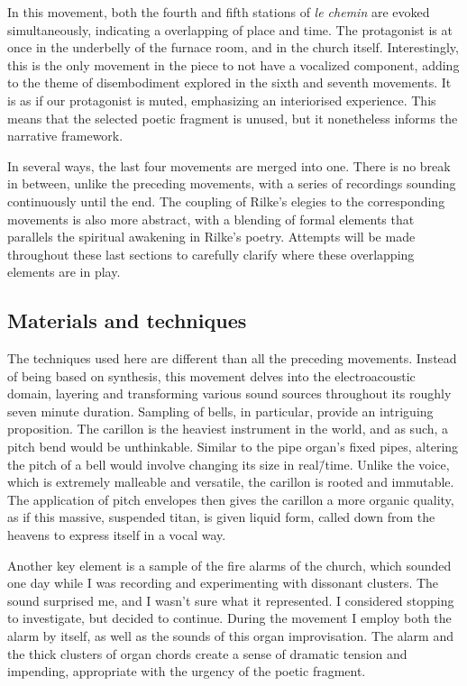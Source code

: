 \documentclass[12pt,twoside,maitrise]{dms_ks}
\theoremstyle{definition}
\begin{document}
{In this movement, both the fourth and fifth stations of \textit{le chemin} are evoked simultaneously, indicating a overlapping of place and time. 
The protagonist is at once in the underbelly of the furnace room, and in the church itself. 
Interestingly, this is the only movement in the piece to not have a vocalized component, adding to the theme of disembodiment explored in the sixth and seventh movements.
It is as if our protagonist is muted, emphasizing an interiorised experience.
This means that the selected poetic fragment is unused, but it nonetheless informs the narrative framework. 

In several ways, the last four movements are merged into one. 
There is no break in between, unlike the preceding movements, with a series of recordings sounding continuously until the end. 
The coupling of Rilke's elegies to the corresponding movements is also more abstract, with a blending of formal elements that parallels the spiritual awakening in Rilke’s poetry. 
Attempts will be made throughout these last sections to carefully clarify where these overlapping elements are in play.

\subsection{Materials and techniques}

The techniques used here are different than all the preceding movements. 
Instead of being based on synthesis, this movement delves into the electroacoustic domain, layering and transforming various sound sources throughout its roughly seven minute duration. 
Sampling of bells, in particular, provide an intriguing proposition. 
The carillon is the heaviest instrument in the world, and as such, a pitch bend would be unthinkable. 
Similar to the pipe organ's fixed pipes, altering the pitch of a bell would involve changing its size in real\=/time. 
Unlike the voice, which is extremely malleable and versatile, the carillon is rooted and immutable. 
The application of pitch envelopes then gives the carillon a more organic quality, as if this massive, suspended titan, is given liquid form, called down from the heavens to express itself in a vocal way.

Another key element is a sample of the fire alarms of the church, which sounded one day while I was recording and experimenting with dissonant clusters. 
The sound surprised me, and I wasn’t sure what it represented. 
I considered stopping to investigate, but decided to continue. 
During the movement I employ both the alarm by itself, as well as the sounds of this organ improvisation.
The alarm and the thick clusters of organ chords create a sense of dramatic tension and impending, appropriate with the urgency of the poetic fragment. 

}
\end{document}
